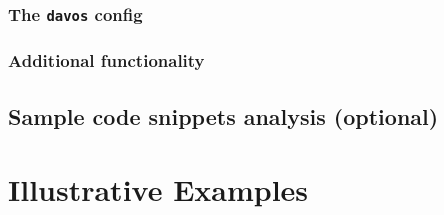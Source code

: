 \documentclass[preprint,12pt, a4paper]{elsarticle}
\begin{document}
%
%
%
%
%

\subsubsection{The \texttt{davos} config}

\subsubsection{Additional functionality}



\subsection{Sample code snippets analysis (optional)}


\section{Illustrative Examples}

\end{document}
